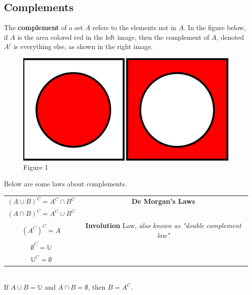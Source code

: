 \documentclass{article}
\begin{document}
        \pagebreak
        \subsection{Complements}
            The \textbf{complement} of a set $A$ refers to the elements not in $A$. In the figure
            below, if $A$ is the area colored red in the left image, then the complement of $A$,
            denoted $A^c$ is everything else, as shown in the right image.

            \begin{figure}[hbt!]
                \centering
                \includegraphics[scale=0.4]{Resources/Unit1SetTheory/complement1.PNG}
                \caption*{Figure 1}
            \end{figure}

            \noindent Below are some laws about complements.

            \begin{center}
                \begin{tabular}{|c|c|}
                    \hline
                    $(A\cup B)^C = A^C \cap B^C$ & \textbf{De Morgan's Laws} \\
                    $(A\cap B)^C = A^C \cup B^C$ & \\ \hline
                    $(A^C)^C=A$ & \textbf{Involution} Law, \textit{also known as "double complement law"} \\ \hline
                    $\emptyset^C=\mathbb{U}$ & \\ \hline
                    $\mathbb{U}^C=\emptyset$ & \\ \hline
                \end{tabular}
            \end{center}\\

            \noindent If $A\cup B=\mathbb{U}$ and $A\cap B=\emptyset$, then $B=A^C$.
\end{document}
